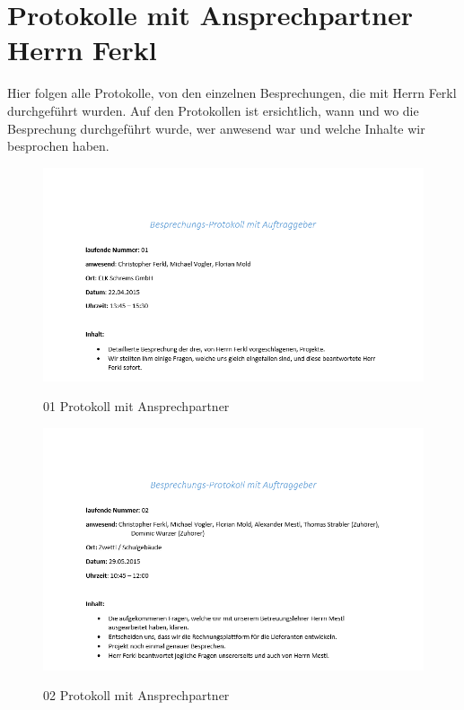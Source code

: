 \section{Protokolle mit Ansprechpartner Herrn Ferkl}
Hier folgen alle Protokolle, von den einzelnen Besprechungen, die mit Herrn Ferkl durchgeführt wurden. Auf den Protokollen ist ersichtlich, wann und wo die Besprechung durchgeführt wurde, wer anwesend war und welche Inhalte wir besprochen haben.
\begin{figure}[!h]
    \centering
    \includegraphics[width=16cm]{figures/Ferkl_01.png}
    \label{fig:01_Protokoll_Ansprechpartner}
    \caption{01 Protokoll mit Ansprechpartner}
\end{figure}

\begin{figure}[!h]
    \centering
    \includegraphics[width=16cm]{figures/Ferkl_02.png}
    \label{fig:02_Protokoll_Ansprechpartner}
    \caption{02 Protokoll mit Ansprechpartner}
\end{figure}
\newpage

